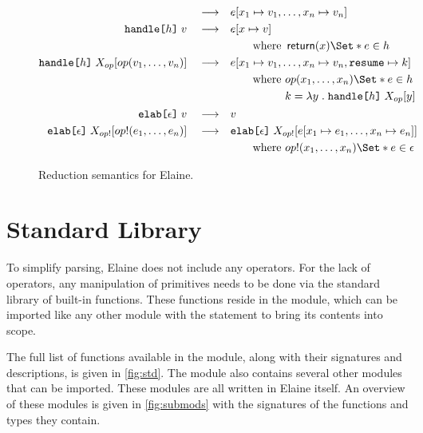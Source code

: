 \begin{figure}[p]
\begin{align*}
    \reduce& e[x_1 \mapsto v_1, \dots, x_n \mapsto v_n]
    \\
    \kw{handle}\tok{[}h\tok{]}\;v \reduce& e[x\mapsto v] \\
    &\qquad\text{where } \return(x) \S{ e } \in h\\
    \kw{handle}\tok{[}h\tok{]}\;X_{op}[op(v_1, \dots, v_n)] \reduce& e[x_1\mapsto v_1, \dots, x_n\mapsto v_n, \kw{resume} \mapsto k] \\
    &\qquad \text{where } \begin{aligned}[t]
        & op(x_1, \dots, x_n) \S{e} \in h\\
        & k = \lam{y}{\kw{handle}\tok{[}h\tok{]}\;
        X_{op}[y]}
    \end{aligned}\\
    \kw{elab}\tok{[}\epsilon\tok{]}\;v \reduce& v\\
    \kw{elab}\tok{[}\epsilon\tok{]}\;X_{op!}[op!(e_1, \dots, e_n)] \reduce& \kw{elab}\tok{[}\epsilon\tok{]}\;X_{op!}[e[x_1 \mapsto e_1, \dots, x_n \mapsto e_n]] \\
    &\qquad \text{where } op!(x_1, \dots, x_n) \S{e} \in \epsilon \\
\end{align*}
\caption{Reduction semantics for Elaine.}
\label{fig:reductionsemantics}
\end{figure}

\section{Standard Library}\label{sec:std}

To simplify parsing, Elaine does not include any operators. For the lack of operators, any manipulation of primitives needs to be done via the standard library of built-in functions. These functions reside in the  module, which can be imported like any other module with the  statement to bring its contents into scope.

The full list of functions available in the  module, along with their signatures and descriptions, is given in \cref{fig:std}. The  module also contains several other modules that can be imported. These modules are all written in Elaine itself. An overview of these modules is given in \cref{fig:submods} with the signatures of the functions and types they contain.

